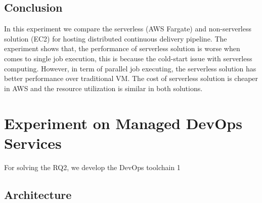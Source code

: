 \subsection{Conclusion}
In this experiment we compare the serverless (AWS Fargate) and non-serverless solution (EC2) for hosting distributed continuous delivery pipeline. The experiment shows that, the performance of serverless solution is worse when comes to single job execution, this is because the cold-start issue with serverless computing. However, in term of parallel job executing, the serverless solution has better performance over traditional VM. The cost of serverless solution is cheaper in AWS and the resource utilization is similar in both solutions.
\section{Experiment on Managed DevOps Services}
For solving the RQ2, we develop the DevOps toolchain        1
\subsection{Architecture}
